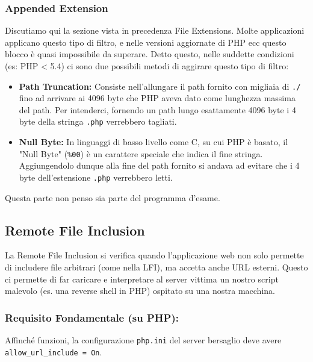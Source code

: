 \documentclass[12pt,a4paper]{report}
\begin{document}
	\subsubsection{Appended Extension}
	Discutiamo qui la sezione vista in precedenza File Extensions. Molte applicazioni applicano questo tipo di filtro, e nelle versioni aggiornate di PHP ecc questo blocco è quasi impossibile da superare. Detto questo, nelle suddette condizioni (es: PHP < 5.4) ci sono due possibili metodi di aggirare questo tipo di filtro:
	\begin{itemize}
		\item \textbf{Path Truncation:} Consiste nell'allungare il path fornito con migliaia di \texttt{./} fino ad arrivare ai 4096 byte che PHP aveva dato come lunghezza massima del path. Per intenderci, fornendo un path lungo esattamente 4096 byte i 4 byte della stringa \texttt{.php} verrebbero tagliati.
		\item \textbf{Null Byte:} In linguaggi di basso livello come C, su cui PHP è basato, il "Null Byte" (\texttt{\%00}) è un carattere speciale che indica il fine stringa. Aggiungendolo dunque alla fine del path fornito si andava ad evitare che i 4 byte dell'estensione \texttt{.php} verrebbero letti.
	\end{itemize}
	
	\begin{nota}
		Questa parte non penso sia parte del programma d'esame.
	\end{nota}
	
	\subsection{Remote File Inclusion}
	La Remote File Inclusion si verifica quando l'applicazione web non solo permette di includere file arbitrari (come nella LFI), ma accetta anche URL esterni. Questo ci permette di far caricare e interpretare al server vittima un nostro script malevolo (es. una reverse shell in PHP) ospitato su una nostra macchina.
	
	\subsubsection{Requisito Fondamentale (su PHP):}
	Affinché funzioni, la configurazione \texttt{php.ini} del server bersaglio deve avere \texttt{allow\_url\_include = On}.
	
\end{document}
